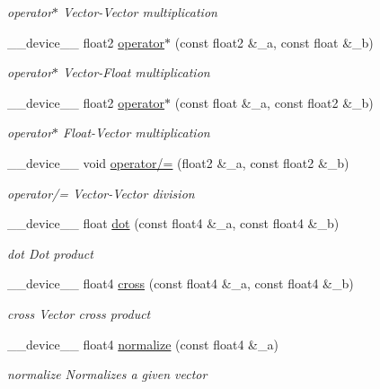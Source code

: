 \begin{DoxyCompactItemize}
\begin{DoxyCompactList}\small\item\em operator$\ast$ Vector-\/\-Vector multiplication \end{DoxyCompactList}\item 
\-\_\-\-\_\-device\-\_\-\-\_\- float2 \hyperlink{MathHelpers_8cuh_aea83e7300751487dd17c6bc918e326d4}{operator$\ast$} (const float2 \&\-\_\-a, const float \&\-\_\-b)
\begin{DoxyCompactList}\small\item\em operator$\ast$ Vector-\/\-Float multiplication \end{DoxyCompactList}\item 
\-\_\-\-\_\-device\-\_\-\-\_\- float2 \hyperlink{MathHelpers_8cuh_a9a67ff307ea6af26e06754d0db14c8bc}{operator$\ast$} (const float \&\-\_\-a, const float2 \&\-\_\-b)
\begin{DoxyCompactList}\small\item\em operator$\ast$ Float-\/\-Vector multiplication \end{DoxyCompactList}\item 
\-\_\-\-\_\-device\-\_\-\-\_\- void \hyperlink{MathHelpers_8cuh_a32ff41e712ed04ea8b45f8a3915d74c4}{operator/=} (float2 \&\-\_\-a, const float2 \&\-\_\-b)
\begin{DoxyCompactList}\small\item\em operator/= Vector-\/\-Vector division \end{DoxyCompactList}\item 
\-\_\-\-\_\-device\-\_\-\-\_\- float \hyperlink{MathHelpers_8cuh_ab32ad31d03f2fc9d78ae15ae00571950}{dot} (const float4 \&\-\_\-a, const float4 \&\-\_\-b)
\begin{DoxyCompactList}\small\item\em dot Dot product \end{DoxyCompactList}\item 
\-\_\-\-\_\-device\-\_\-\-\_\- float4 \hyperlink{MathHelpers_8cuh_a70bbccab5c43317c98743fcbb16f1fe9}{cross} (const float4 \&\-\_\-a, const float4 \&\-\_\-b)
\begin{DoxyCompactList}\small\item\em cross Vector cross product \end{DoxyCompactList}\item 
\-\_\-\-\_\-device\-\_\-\-\_\- float4 \hyperlink{MathHelpers_8cuh_ab505c6170599adb7d8cd7c983da3b0ad}{normalize} (const float4 \&\-\_\-a)
\begin{DoxyCompactList}\small\item\em normalize Normalizes a given vector \end{DoxyCompactList}\item 

\end{DoxyCompactItemize}
